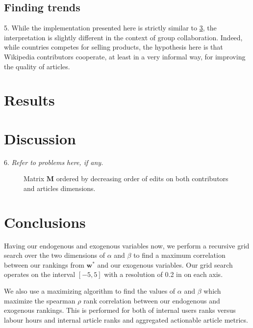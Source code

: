 \documentclass{acm_proc_article-sp}
\begin{document}
\subsection{Finding trends}

5. While the implementation presented here is strictly similar to \ref{}, the interpretation is slightly different in the context of group collaboration. Indeed, while countries competes for selling products, the hypothesis here is that Wikipedia contributors cooperate, at least in a very informal way, for improving the quality of articles.

\section{Results}




\section{Discussion}

6. {\it Refer to problems here, if any.}




\begin{figure}
\centering
\caption{Matrix $\mathbf{M}$ ordered by decreasing order of edits on both contributors and articles dimensions.}
\label{fig:matrix}
\end{figure}

\section{Conclusions}


%
Having our endogenous and exogenous variables now, we perform a recursive grid search over the two dimensions of $\alpha$ and $\beta$ to find a maximum correlation between our rankings from $\mathbf{w^*}$ and our exogenous variables. Our grid search operates on the interval $[-5,5]$ with a resolution of 0.2 in on each axis.


We also use a maximizing algorithm to find the values of $\alpha$ and $\beta$ which maximize the spearman $\rho$ rank correlation between our endogenous and exogenous rankings. This is performed for both of internal users ranks versus labour hours and internal article ranks and aggregated actionable article metrics.
\end{document}
